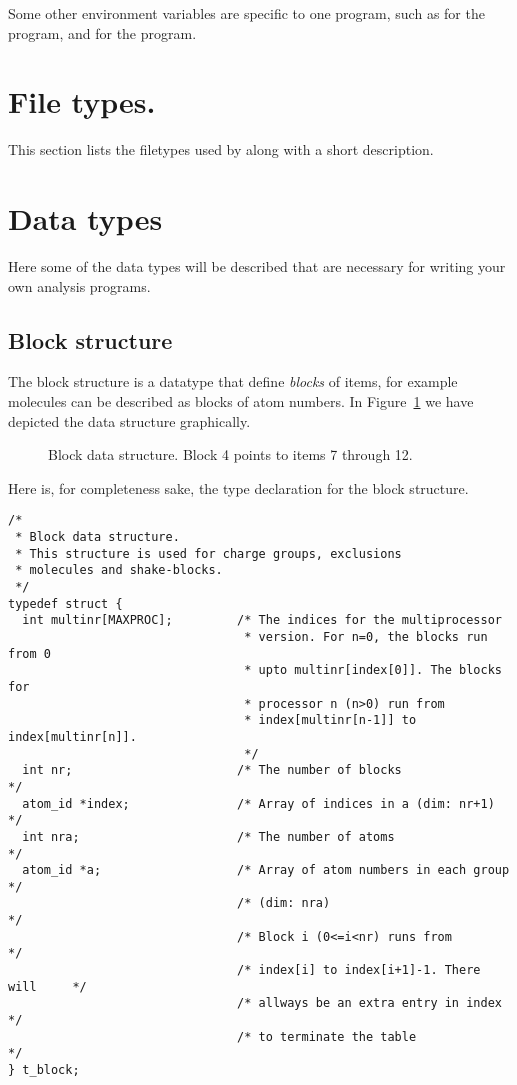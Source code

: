 Some other environment variables are specific to one program, such as
 for the  program, and
 for the  program.

\section{File types.}
\label{sec:fileformats}
This section lists the filetypes used by {\gromacs} along with a 
short description.


\section{Data types}
Here some of the data types will be described that are necessary for writing
your own analysis programs.

\subsection{Block structure}
The block structure is a datatype that define {\em blocks} of items,
for example molecules can be described as blocks of atom numbers.
In Figure~\ref{fig:block} we have depicted the data structure graphically.
\begin{figure}
\centerline{}
\caption{Block data structure. Block 4 points to items 7 through 12.}
\label{fig:block}
\end{figure}

Here is, for completeness sake,
the type declaration for the block structure.
\begin{verbatim}
/*
 * Block data structure.
 * This structure is used for charge groups, exclusions
 * molecules and shake-blocks.
 */
typedef struct {
  int multinr[MAXPROC];         /* The indices for the multiprocessor 
                                 * version. For n=0, the blocks run from 0
                                 * upto multinr[index[0]]. The blocks for 
                                 * processor n (n>0) run from 
                                 * index[multinr[n-1]] to index[multinr[n]].
                                 */
  int nr;                       /* The number of blocks                     */
  atom_id *index;               /* Array of indices in a (dim: nr+1)        */
  int nra;                      /* The number of atoms                      */
  atom_id *a;                   /* Array of atom numbers in each group      */
                                /* (dim: nra)                               */
                                /* Block i (0<=i<nr) runs from              */
                                /* index[i] to index[i+1]-1. There will     */
                                /* allways be an extra entry in index       */
                                /* to terminate the table                   */
} t_block;
\end{verbatim}



